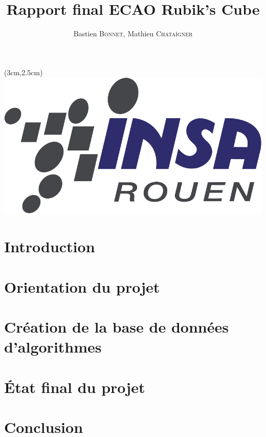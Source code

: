 \documentclass[a4paper,11pt]{report}
\title{Rapport final ECAO Rubik's Cube}
\author{Bastien \textsc{Bonnet}, Mathieu \textsc{Chataîgner}}
\begin{document}
  
  \begin{center}
  \begin{textblock*}{5cm}(3cm,2.5cm)
  \includegraphics[scale=.35]{images/INSA.pdf}\\
  \end{textblock*}
  \end{center}  
  
  \maketitle
  
   
  \newpage
  \tableofcontents
  
  \newpage
  \chapter*{Introduction}
  
   
  \newpage
  \chapter{Orientation du projet}
  
  
  \newpage
  \chapter{Création de la base de données d'algorithmes}
  
  
  \newpage
  \chapter{État final du projet}
  
  
  \newpage
  \chapter*{Conclusion}
  
  
\end{document}
